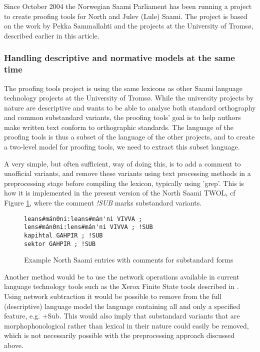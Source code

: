 \documentclass[a4paper,english]{article}
\begin{document}
Since October 2004 the Norwegian Saami Parliament has been running a project to create proofing tools for North and Julev (Lule) Saami. The project is based on the work by Pekka Sammallahti and the projects at the University of Tromsø, described earlier in this article.

\subsubsection{Handling descriptive and normative models at the same time}

The proofing tools project is using the same lexicons as other Saami language technology projects at the University of Tromsø. While the university projects by nature are descriptive and wants to be able to analyse both standard orthography and common substandard variants, the proofing tools' goal is to help authors make written text conform to orthographic standards. The language of the proofing tools is thus a subset of the language of the other projects, and to create a two-level model for proofing tools, we need to extract this subset language.

A very simple, but often sufficient, way of doing this, is to add a comment to unofficial variants, and remove these variants using text processing methods in a preprocessing stage before compiling the lexicon, typically using 'grep'. This is how it is implemented in the present version of the North Saami TWOL, cf Figure \ref{sublex}, where the comment \textit{!SUB} marks  substandard variants.

\begin{figure}[htbp]
\begin{center}
\begin{verbatim}
leans#mán0ni:leans#mán'ni VIVVA ;
lens#mán0ni:lens#mán'ni VIVVA ; !SUB
kapihtal GAHPIR ; !SUB
sektor GAHPIR ; !SUB
\end{verbatim}
\caption{Example North Saami entries with comments for substandard forms}
\label{sublex}
\end{center}
\end{figure}

Another method would be to use the network operations available in current language technology tools such as the Xerox Finite State tools described in \cite{Beesley03}. Using network subtraction it would be possible to remove from the full (descriptive) language model the language containing all and only a specified feature, e.g. +Sub. This would also imply that substandard variants that are morphophonological rather than lexical in their nature could easily be removed, which is not necessarily possible with the preprocessing approach discussed above.
\end{document}
